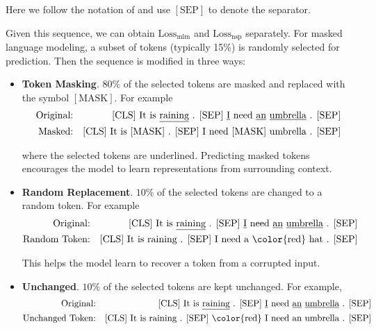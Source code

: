 \noindent Here we follow the notation of \cite{devlin-etal:2019bert} and use $\mathrm{[SEP]}$ to denote the separator.

Given this sequence, we can obtain $\mathrm{Loss}_{\mathrm{mlm}}$ and $\mathrm{Loss}_{\mathrm{nsp}}$ separately. For masked language modeling, a subset of tokens (typically 15\%) is randomly selected for prediction. Then the sequence is modified in three ways:

\begin{itemize}
\item \vspace{0.5em} \textbf{Token Masking}. $80\%$ of the selected tokens are masked and replaced with the symbol $\mathrm{[MASK]}$. For example
\begin{eqnarray}
\textrm{Original:} & & \textrm{$[\mathrm{CLS}]$ It is \underline{raining} . $[\mathrm{SEP}]$ \underline{I} need \underline{an} \underline{umbrella} . $[\mathrm{SEP}]$} \nonumber \\
\textrm{Masked:} &  & \textrm{$[\mathrm{CLS}]$ It is $\mathrm{[MASK]}$ . $[\mathrm{SEP}]$ I need $\mathrm{[MASK]}$ umbrella . $[\mathrm{SEP}]$} \nonumber
\end{eqnarray}

\noindent where the selected tokens are underlined. Predicting masked tokens encourages the model to learn representations from surrounding context.

\item \vspace{0.3em} \textbf{Random Replacement}. $10\%$ of the selected tokens are changed to a random token. For example
\begin{eqnarray}
\textrm{Original:} & & \textrm{$[\mathrm{CLS}]$ It is \underline{raining} . $[\mathrm{SEP}]$ \underline{I} need \underline{an} \underline{umbrella} . $[\mathrm{SEP}]$} \nonumber \\
\textrm{Random Token:} & & \textrm{$[\mathrm{CLS}]$ It is raining . $[\mathrm{SEP}]$ I need a {\color{red} hat} . $[\mathrm{SEP}]$} \nonumber
\end{eqnarray}

\noindent This helps the model learn to recover a token from a corrupted input.

\item \vspace{0.3em} \textbf{Unchanged}. $10\%$ of the selected tokens are kept unchanged. For example,
\begin{eqnarray}
\textrm{Original:} & & \textrm{$[\mathrm{CLS}]$ It is \underline{raining} . $[\mathrm{SEP}]$ \underline{I} need \underline{an} \underline{umbrella} . $[\mathrm{SEP}]$} \nonumber \\
\textrm{Unchanged Token:} & & \textrm{$[\mathrm{CLS}]$ It is raining . $[\mathrm{SEP}]$ {\color{red} I} need an umbrella . $[\mathrm{SEP}]$} \nonumber
\end{eqnarray}


\end{itemize}
